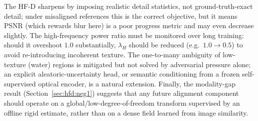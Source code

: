 The HF-D sharpens by imposing realistic detail statistics, not ground-truth-exact detail; under
misaligned references this is the correct objective, but it means PSNR (which rewards blur here)
is a poor progress metric and may even decrease slightly. The high-frequency power ratio must be
monitored over long training: should it overshoot $1.0$ substantially, $\lambda_H$ should be
reduced (e.g.\ $1.0\!\rightarrow\!0.5$) to avoid re-introducing incoherent texture. The
one-to-many ambiguity of low-texture (water) regions is mitigated but not solved by adversarial
pressure alone; an explicit aleatoric-uncertainty head, or semantic conditioning from a frozen
self-supervised optical encoder, is a natural extension. Finally, the modality-gap result
(Section~\ref{sec:hfd:neg1}) suggests that any future alignment component should operate on a
global/low-degree-of-freedom transform supervised by an offline rigid estimate, rather than on a
dense field learned from image similarity.
